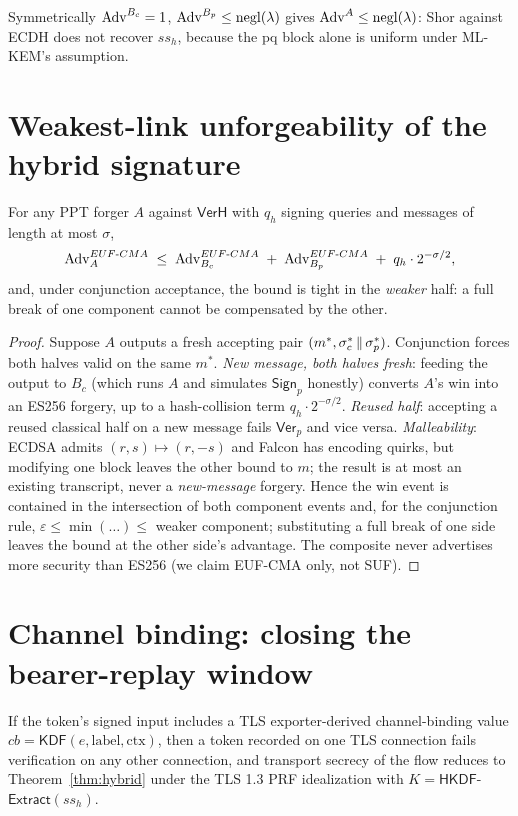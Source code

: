 \begin{corollary}
\label{corr:e2}
Symmetrically $\mathrm{Adv}^{B_c} = 1$, $\mathrm{Adv}^{B_p} \le \mathrm{negl}(\lambda)$ gives
$\mathrm{Adv}^{A} \le \mathrm{negl}(\lambda)$: Shor against ECDH does not recover $ss_h$, because the
pq block alone is uniform under ML-KEM's assumption.
\end{corollary}

\section{Weakest-link unforgeability of the hybrid signature}
\begin{theorem}
\label{thm:forge}
For any PPT forger $A$ against $\mathsf{VerH}$ with $q_h$ signing queries and
messages of length at most $\sigma$,
\[
  \mathrm{Adv}^{EUF\text{-}CMA}_{A}
  \;\le\;
  \mathrm{Adv}^{EUF\text{-}CMA}_{B_c}
  \;+\;
  \mathrm{Adv}^{EUF\text{-}CMA}_{B_p}
  \;+\;
  q_h\cdot 2^{-\sigma/2},
\]
and, under conjunction acceptance, the bound is tight in the \emph{weaker}
half: a full break of one component cannot be compensated by the other.
\end{theorem}

\begin{proof}
Suppose $A$ outputs a fresh accepting pair $(m^*, \sigma_c^*\,\|\,\sigma_p^*)$.
Conjunction forces both halves valid on the same $m^*$.
\emph{New message, both halves fresh}: feeding the output to $B_c$ (which runs
$A$ and simulates $\mathsf{Sign}_p$ honestly) converts $A$'s win into an ES256
forgery, up to a hash-collision term $q_h\cdot 2^{-\sigma/2}$.
\emph{Reused half}: accepting a reused classical half on a new message fails
$\mathsf{Ver}_p$ and vice versa. \emph{Malleability}: ECDSA admits
$(r,s)\mapsto(r,-s)$ and Falcon has encoding quirks, but modifying one block
leaves the other bound to $m$; the result is at most an existing transcript,
never a \emph{new-message} forgery. Hence the win event is contained in the
intersection of both component events and, for the conjunction rule,
$\varepsilon \le \min(\ldots) \le$ weaker component; substituting a full break
of one side leaves the bound at the other side's advantage. The composite
never advertises more security than ES256 (we claim EUF-CMA only, not SUF).
\end{proof}

\section{Channel binding: closing the bearer-replay window}
\begin{theorem}
\label{thm:bind}
If the token's signed input includes a TLS exporter-derived channel-binding
value $cb = \mathsf{KDF}(e, \text{label}, \text{ctx})$, then a token recorded
on one TLS connection fails verification on any other connection, and
transport secrecy of the flow reduces to Theorem~\ref{thm:hybrid} under the
TLS 1.3 PRF idealization with $K = \mathsf{HKDF}$-$\mathsf{Extract}(ss_h)$.
\end{theorem}

